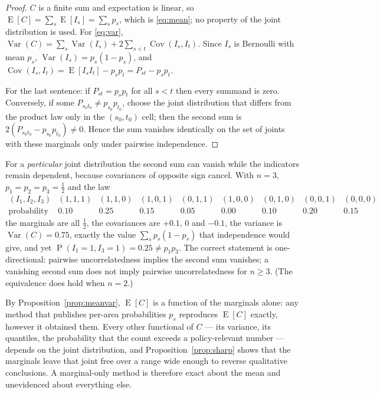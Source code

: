 \begin{proof}
$C$ is a finite sum and expectation is linear, so
$\operatorname{E}[C] = \sum_s \operatorname{E}[I_s] = \sum_s p_s$, which is
\eqref{eq:mean}; no property of the joint distribution is used.  For
\eqref{eq:var}, $\operatorname{Var}(C) = \sum_s \operatorname{Var}(I_s)
+ 2\sum_{s<t}\operatorname{Cov}(I_s,I_t)$.  Since $I_s$ is Bernoulli with mean
$p_s$, $\operatorname{Var}(I_s) = p_s(1-p_s)$, and
$\operatorname{Cov}(I_s,I_t) = \operatorname{E}[I_s I_t] - p_s p_t = P_{st} - p_s p_t$.

For the last sentence: if $P_{st} = p_s p_t$ for all $s<t$ then every summand
is zero.  Conversely, if some $P_{s_0 t_0} \ne p_{s_0} p_{t_0}$, choose the joint
distribution that differs from the product law only in the
$(s_0,t_0)$ cell; then the second sum is $2(P_{s_0t_0} - p_{s_0}p_{t_0}) \ne 0$.
Hence the sum vanishes identically on the set of joints with these marginals
only under pairwise independence.
\end{proof}

\begin{remark}
\label{rem:converse}
For a \emph{particular} joint distribution the second sum can vanish while the
indicators remain dependent, because covariances of opposite sign cancel.  With
$n=3$, $p_1=p_2=p_3=\tfrac12$ and the law
\[
  \begin{array}{c|cccccccc}
    (I_1,I_2,I_3) & (1,1,1) & (1,1,0) & (1,0,1) & (0,1,1) & (1,0,0) & (0,1,0) & (0,0,1) & (0,0,0)\\[2pt]
    \hline
    \text{probability} & 0.10 & 0.25 & 0.15 & 0.05 & 0.00 & 0.10 & 0.20 & 0.15
  \end{array}
\]
the marginals are all $\tfrac12$, the covariances are $+0.1$, $0$ and $-0.1$,
the variance is $\operatorname{Var}(C) = 0.75$, exactly the value
$\sum_s p_s(1-p_s)$ that independence would give, and yet
$\operatorname{P}(I_1=1,I_3=1)=0.25 \neq p_1p_3$.  The correct statement is
one-directional: pairwise uncorrelatedness implies the second sum vanishes;
a vanishing second sum does not imply pairwise uncorrelatedness for $n \ge 3$.
(The equivalence does hold when $n=2$.)
\end{remark}

\begin{remark}
\label{rem:consequence}
By Proposition~\ref{prop:meanvar}, $\operatorname{E}[C]$ is a function of the
marginals alone: any method that publishes per-area probabilities $p_s$
reproduces $\operatorname{E}[C]$ exactly, however it obtained them.  Every
other functional of $C$ --- its variance, its quantiles, the probability that
the count exceeds a policy-relevant number --- depends on the joint
distribution, and Proposition~\ref{prop:sharp} shows that the marginals leave
that joint free over a range wide enough to reverse qualitative conclusions.
A marginal-only method is therefore exact about the mean and unevidenced about
everything else.
\end{remark}

